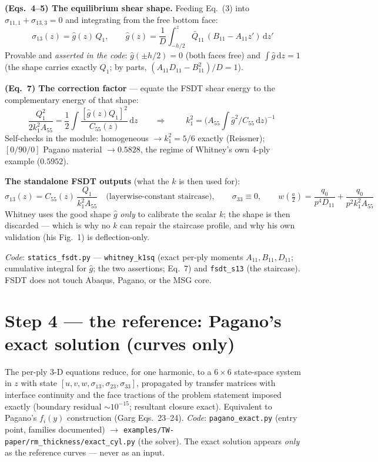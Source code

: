 \documentclass[11pt]{article}
\newcommand{\code}[1]{\texttt{#1}}
\begin{document}
\textbf{(Eqs.~4--5) The equilibrium shear shape.}  Feeding Eq.~(3) into
$\sigma_{11,1}+\sigma_{13,3}=0$ and integrating from the free bottom face:
\begin{equation}
\sigma_{13}(z) = \hat g(z)\,Q_1,\qquad
\hat g(z) = \frac1D\int_{-h/2}^{z}\bar Q_{11}\,(B_{11}-A_{11}z')\,\mathrm dz'
\end{equation}
Provable and \emph{asserted in the code}: $\hat g(\pm h/2) = 0$ (both faces free) and
$\int\hat g\,\mathrm dz = 1$ (the shape carries exactly $Q_1$; by parts,
$(A_{11}D_{11}-B_{11}^2)/D = 1$).

\textbf{(Eq.~7) The correction factor} --- equate the FSDT shear energy to the
complementary energy of that shape:
\begin{equation}
\frac{Q_1^2}{2k_1^2A_{55}} = \frac12\int\frac{[\hat g(z)Q_1]^2}{C_{55}(z)}\,\mathrm dz
\qquad\Longrightarrow\qquad
\boxed{\;k_1^2 = \Big(A_{55}\int \hat g^2/C_{55}\,\mathrm dz\Big)^{-1}\;}
\end{equation}
Self-checks in the module: homogeneous $\rightarrow k_1^2 = 5/6$ exactly (Reissner);
$[0/90/0]$ Pagano material $\rightarrow 0.5828$, the regime of Whitney's own 4-ply
example ($0.5952$).

\textbf{The standalone FSDT outputs} (what the $k$ is then used for):
\begin{equation}
\sigma_{13}(z) = C_{55}(z)\,\frac{Q_1}{k_1^2A_{55}} \quad\text{(layerwise-constant
staircase)},\qquad \sigma_{33}\equiv 0,\qquad
w\!\left(\tfrac a2\right) = \frac{q_0}{p^4D_{11}} + \frac{q_0}{p^2k_1^2A_{55}}
\end{equation}
Whitney uses the good shape $\hat g$ \emph{only} to calibrate the scalar $k$; the shape
is then discarded --- which is why no $k$ can repair the staircase profile, and why his
own validation (his Fig.~1) is deflection-only.

\emph{Code}: \code{statics\_fsdt.py} --- \code{whitney\_k1sq} (exact per-ply moments
$A_{11},B_{11},D_{11}$; cumulative integral for $\hat g$; the two assertions; Eq.~7) and
\code{fsdt\_s13} (the staircase).  FSDT does not touch Abaqus, Pagano, or the MSG core.

\section{Step 4 --- the reference: Pagano's exact solution (curves only)}

The per-ply 3-D equations reduce, for one harmonic, to a $6\times6$ state-space system
in $z$ with state $[u,v,w,\sigma_{13},\sigma_{23},\sigma_{33}]$, propagated by transfer
matrices with interface continuity and the face tractions of the problem statement
imposed exactly (boundary residual $\sim 10^{-15}$; resultant closure exact).
Equivalent to Pagano's $f_i(y)$ construction (Garg Eqs.~23--24).
\emph{Code}: \code{pagano\_exact.py} (entry point, families documented)
$\rightarrow$ \code{examples/TW-paper/rm\_thickness/exact\_cyl.py} (the solver).
The exact solution appears \emph{only} as the reference curves --- never as an input.
\end{document}
